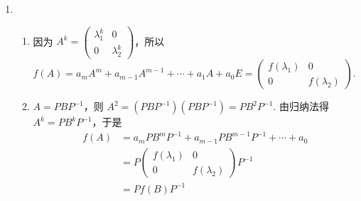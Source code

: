\begin{enumerate}

    \item \begin{enumerate}
              \item 因为 $A^k=\begin{pmatrix}\lambda_1^k & 0 \\ 0 & \lambda_2^k\end{pmatrix}$，所以 $f(A)=a_mA^m+a_{m-1}A^{m-1}+\cdots+a_1A+a_0E = \begin{pmatrix}f(\lambda_1) & 0 \\ 0 & f(\lambda_2)\end{pmatrix}$.
              \item $A=PBP^{-1}$，则 $A^2=(PBP^{-1})(PBP^{-1})=PB^2P^{-1}$. 由归纳法得 $A^k=PB^kP^{-1}$，于是
                    \begin{align*}
                        f(A) & = a_mPB^mP^{-1}+a_{m-1}PB^{m-1}P^{-1}+\cdots+a_0                         \\
                             & =P\begin{pmatrix}f(\lambda_1) & 0 \\ 0 & f(\lambda_2)\end{pmatrix}P^{-1} \\
                             & =Pf(B)P^{-1}
                    \end{align*}
          \end{enumerate}
\end{enumerate}

